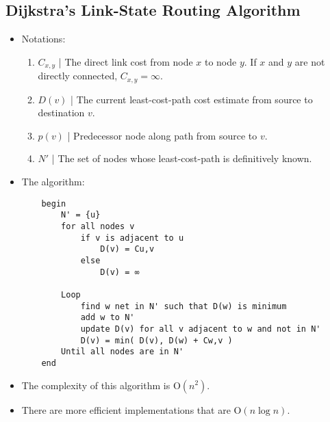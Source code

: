 \documentclass{article}
\begin{document}
    \subsection*{Dijkstra's Link-State Routing Algorithm}
    \begin{itemize}
        \item Notations:
        \begin{enumerate}
            \item $C_{x,y}$ | The direct link cost from node $x$ to node $y$. If $x$ and $y$ are not directly connected, $C_{x,y}=\infty$.
            \item $D(v)$ | The current least-cost-path cost estimate from source to destination $v$.
            \item $p(v)$ | Predecessor node along path from source to $v$.
            \item $N'$ | The set of nodes whose least-cost-path is definitively known.
        \end{enumerate}
        \item The algorithm:
        \begin{verbatim}
    begin
        N' = {u}
        for all nodes v
            if v is adjacent to u
                D(v) = Cu,v
            else
                D(v) = ∞
        
        Loop
            find w net in N' such that D(w) is minimum
            add w to N'
            update D(v) for all v adjacent to w and not in N'
            D(v) = min( D(v), D(w) + Cw,v )
        Until all nodes are in N'
    end
        \end{verbatim}
        \item The complexity of this algorithm is $\text{O}(n^2)$.
        \item There are more efficient implementations that are $\text{O}(n\log{n})$.
    \end{itemize}
\end{document}
